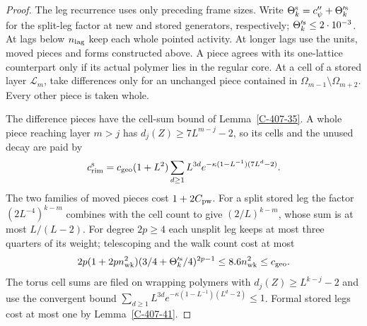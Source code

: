 \documentclass[11pt,letterpaper,reqno]{amsart}
\theoremstyle{definition}
\theoremstyle{remark}
\begin{document}
\begin{proof}
The leg recurrence uses only preceding frame sizes. Write
$\Theta_k^{\rm s}=c''_\psi+\Theta_k^{\prime\rm s}$ for the
split-leg factor at new and stored generators, respectively;
$\Theta_k^{\prime\rm s}\le2\cdot10^{-3}$. At lags below
$n_{\rm lag}$ keep each whole pointed activity. At longer
lags use the units, moved pieces and forms constructed above.
A piece agrees with its one-lattice counterpart only if its
actual polymer lies in the regular core. At a cell of a
stored layer $\mathcal L_m$, take differences only for an
unchanged piece contained in $\Omega_{m-1}\setminus\Omega_{m+2}$.
Every other piece is taken whole.

The difference pieces have the cell-sum bound of
Lemma~\ref{C-407-35}. A whole piece reaching layer $m>j$ has
$d_j(Z)\ge7L^{m-j}-2$, so its cells and the unused decay are
paid by
\[
 c_{\rm rim}^{\rm s}=c_{\rm geo}(1+L^2)
       \sum_{d\ge1}L^{3d}e^{-\kappa(1-L^{-1})(7L^d-2)}.
\]
The two families of moved pieces cost $1+2C_{\rm pw}$.
For a split stored leg the factor $(2L^{-4})^{k-m}$ combines
with the cell count to give $(2/L)^{k-m}$, whose sum is at
most $L/(L-2)$. For degree $2p\ge4$ each unsplit leg keeps
at most three quarters of its weight; telescoping and the
walk count cost at most
\[
 2p(1+2pn_{\rm wk}^2)
      (3/4+\Theta_k^{\prime\rm s}/4)^{2p-1}
       \le8.6n_{\rm wk}^2\le c_{\rm geo}.
\]
The torus cell sums are filed on wrapping polymers with
$d_j(Z)\ge L^{k-j}-2$ and use the convergent bound
$\sum_{d\ge1}L^{3d}e^{-\kappa(1-L^{-1})(L^d-2)}\le1$.
Formal stored legs cost at most one by Lemma~\ref{C-407-41}.


\end{proof}
\end{document}
